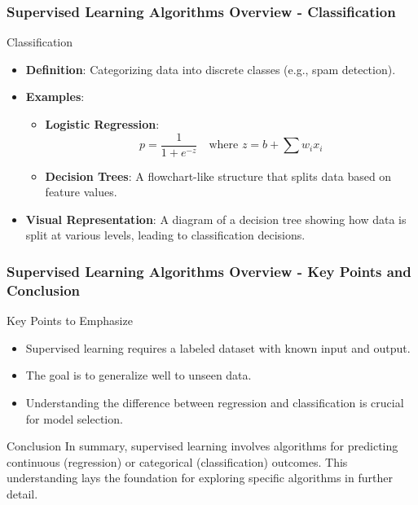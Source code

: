 \documentclass[aspectratio=169]{beamer}
\begin{document}
\begin{frame}[fragile]
    \frametitle{Supervised Learning Algorithms Overview - Classification}
    \begin{block}{Classification}
        \begin{itemize}
            \item \textbf{Definition}: Categorizing data into discrete classes (e.g., spam detection).
            \item \textbf{Examples}:
                \begin{itemize}
                    \item \textbf{Logistic Regression}:
                        \begin{equation}
                        p = \frac{1}{1 + e^{-z}} \quad \text{where } z = b + \sum{w_ix_i}
                        \end{equation}
                    \item \textbf{Decision Trees}: A flowchart-like structure that splits data based on feature values.
                \end{itemize}
            \item \textbf{Visual Representation}: 
            A diagram of a decision tree showing how data is split at various levels, leading to classification decisions.
        \end{itemize}
    \end{block}
\end{frame}

\begin{frame}[fragile]
    \frametitle{Supervised Learning Algorithms Overview - Key Points and Conclusion}
    \begin{block}{Key Points to Emphasize}
        \begin{itemize}
            \item Supervised learning requires a labeled dataset with known input and output.
            \item The goal is to generalize well to unseen data.
            \item Understanding the difference between regression and classification is crucial for model selection.
        \end{itemize}
    \end{block}
    
    \begin{block}{Conclusion}
        In summary, supervised learning involves algorithms for predicting continuous (regression) or categorical (classification) outcomes.
        This understanding lays the foundation for exploring specific algorithms in further detail.
    \end{block}
\end{frame}
\end{document}
